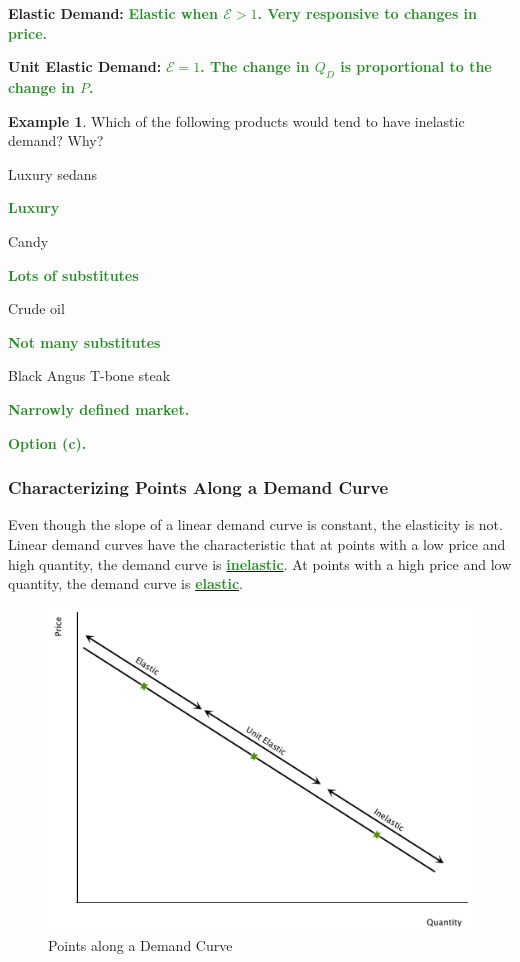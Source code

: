 \documentclass[11pt]{article}\usepackage[]{graphicx}\usepackage[]{color}
\theoremstyle{definition}
\newtheorem{exmp}{Example}[section]
\newcommand{\ddp}[1]{{\textbf{\textcolor{ForestGreen}{#1}}}}
\newcommand{\dd}[1]{{\underline{\textbf{\textcolor{ForestGreen}{#1}}}}}
\newcommand{\defn}[1]{\textbf{#1}}
\begin{document}
	
	\defn{Elastic Demand:} \ddp{Elastic when $\mathcal{E} > 1$. Very responsive to changes in price.\\}
	
	
	\defn{Unit Elastic Demand:} \ddp{$\mathcal{E} = 1$. The change in $Q_D$ is proportional to the change in $P$.\\}
	
		
		\begin{exmp}
			
			Which of the following products would tend to have inelastic demand? Why?
			\begin{enumerate}[(a)]
				{\setlength\itemindent{25pt} \item Luxury sedans} \ddp{Luxury}
				{\setlength\itemindent{25pt} \item Candy} \ddp{Lots of substitutes}
				{\setlength\itemindent{25pt} \item Crude oil} \ddp{Not many substitutes}
				{\setlength\itemindent{25pt} \item Black Angus T-bone steak} \ddp{Narrowly defined market.}
			\end{enumerate}
		\end{exmp}
		\ddp{Option (c).}

	\subsubsection*{Characterizing Points Along a Demand Curve}
	Even though the slope of a linear demand curve is constant, the elasticity is not. Linear demand curves have the characteristic that at points with a low price and high quantity, the demand curve is \dd{inelastic}. At points with a high price and low quantity, the demand curve is \dd{elastic}.

		\begin{figure}[H]
			\centering
			\includegraphics[scale=.42]{plot23.pdf}
			\caption{Points along a Demand Curve}
		\end{figure}
\end{document}
